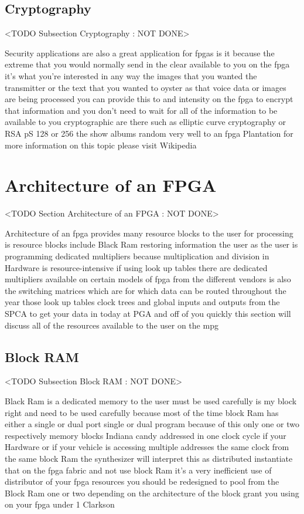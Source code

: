 \subsection{Cryptography}
	<TODO Subsection Cryptography : NOT DONE>

Security applications are also a great application for fpgas is it because the extreme that you would normally send in the clear available to you on the fpga it's what you're interested in any way the images that you wanted the transmitter or the text that you wanted to oyster as that voice data or images are being processed you can provide this to and intensity on the fpga to encrypt that information and you don't need to wait for all of the information to be available to you cryptographic are there such as elliptic curve cryptography or RSA pS 128 or 256 the show albums random very well to an fpga Plantation for more information on this topic please visit Wikipedia

\section{Architecture of an FPGA}
	<TODO Section Architecture of an FPGA : NOT DONE>

Architecture of an fpga provides many resource blocks to the user for processing is resource blocks include Black Ram restoring information the user as the user is programming dedicated multipliers because multiplication and division in Hardware is resource-intensive if using look up tables there are dedicated multipliers available on certain models of fpga from the different vendors is also the switching matrices which are for which data can be routed throughout the year those look up tables clock trees and global inputs and outputs from the SPCA to get your data in today at PGA and off of you quickly this section will discuss all of the resources available to the user on the mpg

\subsection{Block RAM}
	<TODO Subsection Block RAM : NOT DONE>

Black Ram is a dedicated memory to the user must be used carefully is my block right and need to be used carefully because most of the time block Ram has either a single or dual port single or dual program because of this only one or two respectively memory blocks Indiana candy addressed in one clock cycle if your Hardware or if your vehicle is accessing multiple addresses the same clock from the same block Ram the synthesizer will interpret this as distributed instantiate that on the fpga fabric and not use block Ram it's a very inefficient use of distributor of your fpga resources you should be redesigned to pool from the Block Ram one or two depending on the architecture of the block grant you using on your fpga under 1 Clarkson

